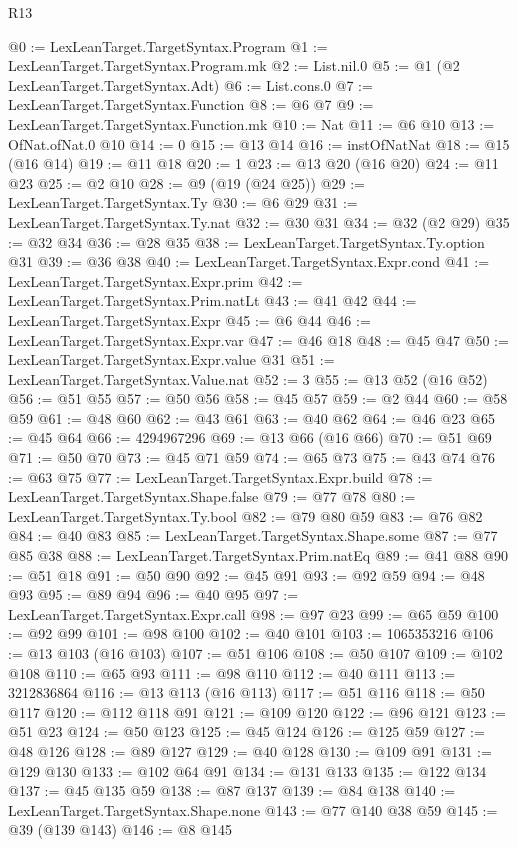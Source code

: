 \begin{lexlean}{R13}
\begin{coremodule}
@0 := LexLeanTarget.TargetSyntax.Program
@1 := LexLeanTarget.TargetSyntax.Program.mk
@2 := List.nil.{0}
@5 := @1 (@2 LexLeanTarget.TargetSyntax.Adt)
@6 := List.cons.{0}
@7 := LexLeanTarget.TargetSyntax.Function
@8 := @6 @7
@9 := LexLeanTarget.TargetSyntax.Function.mk
@10 := Nat
@11 := @6 @10
@13 := OfNat.ofNat.{0} @10
@14 := 0
@15 := @13 @14
@16 := instOfNatNat
@18 := @15 (@16 @14)
@19 := @11 @18
@20 := 1
@23 := @13 @20 (@16 @20)
@24 := @11 @23
@25 := @2 @10
@28 := @9 (@19 (@24 @25))
@29 := LexLeanTarget.TargetSyntax.Ty
@30 := @6 @29
@31 := LexLeanTarget.TargetSyntax.Ty.nat
@32 := @30 @31
@34 := @32 (@2 @29)
@35 := @32 @34
@36 := @28 @35
@38 := LexLeanTarget.TargetSyntax.Ty.option @31
@39 := @36 @38
@40 := LexLeanTarget.TargetSyntax.Expr.cond
@41 := LexLeanTarget.TargetSyntax.Expr.prim
@42 := LexLeanTarget.TargetSyntax.Prim.natLt
@43 := @41 @42
@44 := LexLeanTarget.TargetSyntax.Expr
@45 := @6 @44
@46 := LexLeanTarget.TargetSyntax.Expr.var
@47 := @46 @18
@48 := @45 @47
@50 := LexLeanTarget.TargetSyntax.Expr.value @31
@51 := LexLeanTarget.TargetSyntax.Value.nat
@52 := 3
@55 := @13 @52 (@16 @52)
@56 := @51 @55
@57 := @50 @56
@58 := @45 @57
@59 := @2 @44
@60 := @58 @59
@61 := @48 @60
@62 := @43 @61
@63 := @40 @62
@64 := @46 @23
@65 := @45 @64
@66 := 4294967296
@69 := @13 @66 (@16 @66)
@70 := @51 @69
@71 := @50 @70
@73 := @45 @71 @59
@74 := @65 @73
@75 := @43 @74
@76 := @63 @75
@77 := LexLeanTarget.TargetSyntax.Expr.build
@78 := LexLeanTarget.TargetSyntax.Shape.false
@79 := @77 @78
@80 := LexLeanTarget.TargetSyntax.Ty.bool
@82 := @79 @80 @59
@83 := @76 @82
@84 := @40 @83
@85 := LexLeanTarget.TargetSyntax.Shape.some
@87 := @77 @85 @38
@88 := LexLeanTarget.TargetSyntax.Prim.natEq
@89 := @41 @88
@90 := @51 @18
@91 := @50 @90
@92 := @45 @91
@93 := @92 @59
@94 := @48 @93
@95 := @89 @94
@96 := @40 @95
@97 := LexLeanTarget.TargetSyntax.Expr.call
@98 := @97 @23
@99 := @65 @59
@100 := @92 @99
@101 := @98 @100
@102 := @40 @101
@103 := 1065353216
@106 := @13 @103 (@16 @103)
@107 := @51 @106
@108 := @50 @107
@109 := @102 @108
@110 := @65 @93
@111 := @98 @110
@112 := @40 @111
@113 := 3212836864
@116 := @13 @113 (@16 @113)
@117 := @51 @116
@118 := @50 @117
@120 := @112 @118 @91
@121 := @109 @120
@122 := @96 @121
@123 := @51 @23
@124 := @50 @123
@125 := @45 @124
@126 := @125 @59
@127 := @48 @126
@128 := @89 @127
@129 := @40 @128
@130 := @109 @91
@131 := @129 @130
@133 := @102 @64 @91
@134 := @131 @133
@135 := @122 @134
@137 := @45 @135 @59
@138 := @87 @137
@139 := @84 @138
@140 := LexLeanTarget.TargetSyntax.Shape.none
@143 := @77 @140 @38 @59
@145 := @39 (@139 @143)
@146 := @8 @145

\end{coremodule}
\end{lexlean}
